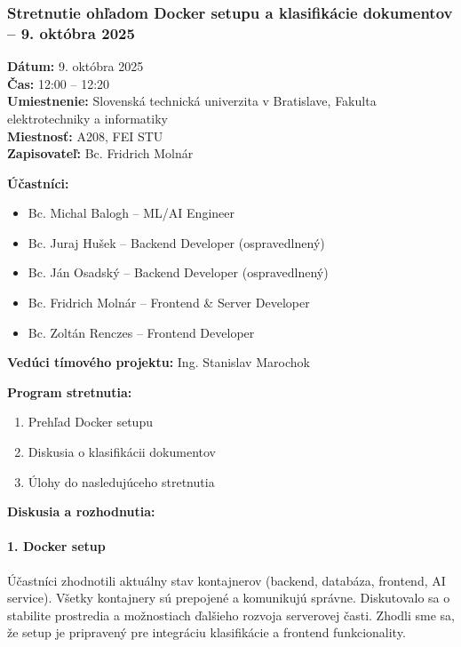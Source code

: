 \subsubsection{Stretnutie ohľadom Docker setupu a klasifikácie dokumentov – 9. októbra 2025}

\textbf{Dátum:} 9. októbra 2025 \\
\textbf{Čas:} 12:00 – 12:20 \\
\textbf{Umiestnenie:} Slovenská technická univerzita v Bratislave, Fakulta elektrotechniky a informatiky \\
\textbf{Miestnosť:} A208, FEI STU \\
\textbf{Zapisovateľ:} Bc. Fridrich Molnár

\vspace{0.5cm}
\textbf{Účastníci:}
\begin{itemize}
    \item Bc. Michal Balogh – ML/AI Engineer
    \item Bc. Juraj Hušek – Backend Developer (ospravedlnený)
    \item Bc. Ján Osadský – Backend Developer (ospravedlnený)
    \item Bc. Fridrich Molnár – Frontend \& Server Developer
    \item Bc. Zoltán Renczes – Frontend Developer
\end{itemize}

\textbf{Vedúci tímového projektu:} Ing. Stanislav Marochok

\vspace{0.5cm}
\textbf{Program stretnutia:}
\begin{enumerate}
    \item Prehľad Docker setupu
    \item Diskusia o klasifikácii dokumentov
    \item Úlohy do nasledujúceho stretnutia
\end{enumerate}

\vspace{0.5cm}
\textbf{Diskusia a rozhodnutia:}

\paragraph{1. Docker setup}
Účastníci zhodnotili aktuálny stav kontajnerov (backend, databáza, frontend, AI service). Všetky kontajnery sú prepojené a komunikujú správne. Diskutovalo sa o stabilite prostredia a možnostiach ďalšieho rozvoja serverovej časti. Zhodli sme sa, že setup je pripravený pre integráciu klasifikácie a frontend funkcionality.

